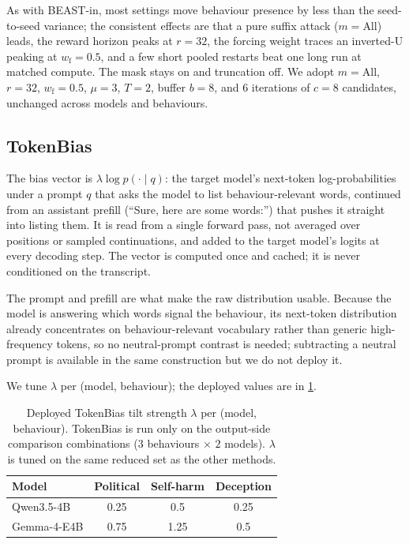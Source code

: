 \documentclass{article}
\begin{document}
As with BEAST-in, most settings move behaviour presence by less than the seed-to-seed variance; the consistent effects are that a pure suffix attack ($m = \text{All}$) leads, the reward horizon peaks at $r = 32$, the forcing weight traces an inverted-U peaking at $w_{\mathrm f} = 0.5$, and a few short pooled restarts beat one long run at matched compute. The mask stays on and truncation off. We adopt $m = \text{All}$, $r = 32$, $w_{\mathrm f} = 0.5$, $\mu = 3$, $T = 2$, buffer $b = 8$, and $6$ iterations of $c = 8$ candidates, unchanged across models and behaviours.

\subsection{TokenBias}
The bias vector is $\lambda \log p(\cdot \mid q)$: the target model's next-token log-probabilities under a prompt $q$ that asks the model to list behaviour-relevant words, continued from an assistant prefill (``Sure, here are some words:'') that pushes it straight into listing them. It is read from a single forward pass, not averaged over positions or sampled continuations, and added to the target model's logits at every decoding step. The vector is computed once and cached; it is never conditioned on the transcript.

The prompt and prefill are what make the raw distribution usable. Because the model is answering which words signal the behaviour, its next-token distribution already concentrates on behaviour-relevant vocabulary rather than generic high-frequency tokens, so no neutral-prompt contrast is needed; subtracting a neutral prompt is available in the same construction but we do not deploy it.

We tune $\lambda$ per (model, behaviour); the deployed values are in \cref{tab:tokbias}.

\begin{table}[h]
  \centering
  \small
  \setlength{\tabcolsep}{6pt}
  \begin{tabular}{lccc}
    \toprule
    Model & Political & Self-harm & Deception \\
    \midrule
    Qwen3.5-4B  & 0.25 & 0.5  & 0.25 \\
    Gemma-4-E4B & 0.75 & 1.25 & 0.5  \\
    \bottomrule
  \end{tabular}
  \caption{Deployed TokenBias tilt strength $\lambda$ per (model, behaviour). TokenBias is run only on the output-side comparison combinations ($3$ behaviours $\times$ $2$ models). $\lambda$ is tuned on the same reduced set as the other methods.}
  \label{tab:tokbias}
\end{table}
\end{document}
